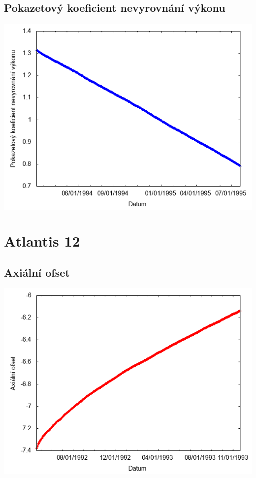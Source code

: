 \documentclass[a4paper,twoside,11pt]{article}
\begin{document}
\subsection*{Pokazetový koeficient nevyrovnání výkonu}
\begin{center}
\includegraphics[width=.8\textwidth]{graphs/Atlantis_11_fha.png}
\end{center}

\newpage
\section*{Atlantis 12}
\subsection*{Axiální ofset}
\begin{center}
\includegraphics[width=.8\textwidth]{graphs/Atlantis_12_ao.png}
\end{center}
\end{document}
